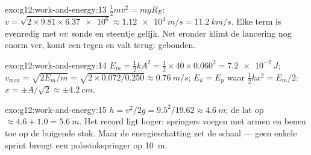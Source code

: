 \begin{solution}{exo:g12:work-and-energy:13}
$\tfrac12 mv^2 = mgR_E$:
$v = \sqrt{2 \times 9.81 \times \num{6.37e6}} \approx \qty{1.12e4}{m/s}
= \qty{11.2}{km/s}$. Elke term is evenredig met $m$: sonde en steentje gelijk.
Net eronder klimt de lancering nog enorm ver, komt een  tegen en valt
terug: gebonden.
\end{solution}

\begin{solution}{exo:g12:work-and-energy:14}
$E_m = \tfrac12 kA^2 = \tfrac12 \times 40 \times 0.060^2 =
\qty{7.2e-2}{J}$; $v_{\max} = \sqrt{2E_m/m} =
\sqrt{2 \times 0.072/0.250} \approx \qty{0.76}{m/s}$; $E_k = E_p$ waar
$\tfrac12 kx^2 = E_m/2$: $x = \pm A/\sqrt 2 \approx \pm\qty{4.2}{cm}$.
\end{solution}

\begin{solution}{exo:g12:work-and-energy:15}
$h = v^2/2g = 9.5^2/19.62 \approx \qty{4.6}{m}$; de lat op $\approx
4.6 + 1.0 = \qty{5.6}{m}$. Het record ligt hoger: springers voegen met armen
en benen  toe op de buigende stok. Maar de energieschatting zet de
schaal --- geen enkele sprint brengt een polsstokspringer op \qty{10}{m}.
\end{solution}

